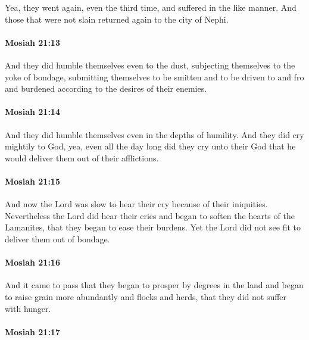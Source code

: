 			Yea, they went again, even the third time,
			and suffered in the like manner.
			And those that were not slain returned again to the city of Nephi.

		\paragraph{Mosiah 21:13} %
			\label{MOSIAH-21-13}

			And they did humble themselves even to the dust,
			subjecting themselves to the yoke of bondage,
			submitting themselves to be smitten
			and to be driven to and fro and burdened
			according to the desires of their enemies.

		\paragraph{Mosiah 21:14} %
			\label{MOSIAH-21-14}

			And they did humble themselves even in the depths of humility.
			And they did cry mightily to God,
			yea, even all the day long did they cry unto their God
			that he would deliver them out of their afflictions.

		\paragraph{Mosiah 21:15} %
			\label{MOSIAH-21-15}

			And now the Lord was slow to hear their cry because of their iniquities.
			Nevertheless the Lord did hear their cries
			and began to soften the hearts of the Lamanites,
			that they began to ease their burdens.
			Yet the Lord did not see fit to deliver them out of bondage.

		\paragraph{Mosiah 21:16} %
			\label{MOSIAH-21-16}

			And it came to pass that they began to prosper by degrees in the land
			and began to raise grain more abundantly and flocks and herds,
			that they did not suffer with hunger.

		\paragraph{Mosiah 21:17} %
			\label{MOSIAH-21-17}

